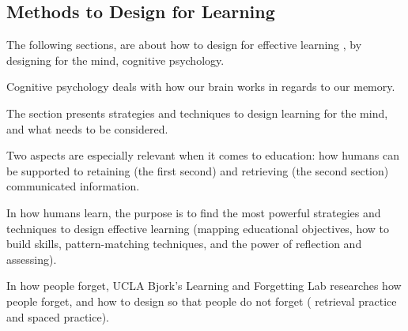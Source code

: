 \subsection{Methods to Design for Learning}


The following sections, are about how to design for effective learning \cite{dirksen}, by designing for the mind, cognitive psychology. %

Cognitive psychology deals with how our brain works in regards to our memory.

The section presents strategies and techniques to design learning for the mind, and what needs to be considered.

Two aspects are especially relevant when it comes to education: how humans can be supported to retaining (the first second) and retrieving (the second section) communicated information.

In how humans learn, the purpose is to find the most powerful strategies and techniques to design effective learning (mapping educational objectives, how to build skills, pattern-matching techniques, and the power of reflection and assessing).

In how people forget, UCLA Bjork's Learning and Forgetting Lab \cite{ucla} researches how people forget, and how to design so that people do not forget ( retrieval practice and spaced practice).




